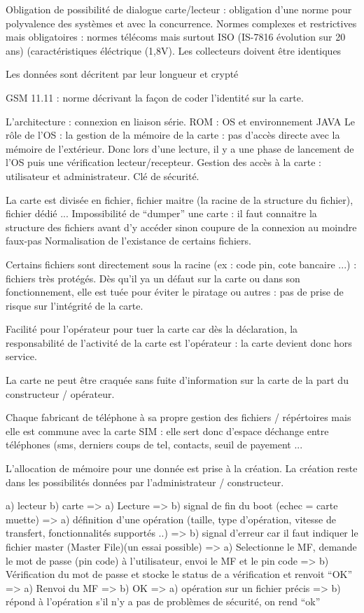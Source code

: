 \documentclass[a4paper,12pt]{article}
\begin{document}
Obligation de possibilité de dialogue carte/lecteur : obligation d'une norme pour polyvalence des systèmes et avec la concurrence.
Normes complexes et restrictives mais obligatoires : normes télécoms mais surtout ISO (IS-7816 évolution sur 20 ans) (caractéristiques éléctrique (1,8V). Les collecteurs doivent être identiques

Les données sont décritent par leur longueur et crypté

GSM 11.11 : norme décrivant la façon de coder l'identité sur la carte.

L'architecture : connexion en liaison série.
ROM : OS et environnement JAVA
Le rôle de l'OS : la gestion de la mémoire de la carte : pas d'accès directe avec la mémoire de l'extérieur.
Donc lors d'une lecture, il y a une phase de lancement de l'OS puis une vérification lecteur/recepteur.
Gestion des accès à la carte : utilisateur et administrateur. Clé de sécurité.

La carte est divisée en fichier, fichier maitre (la racine de la structure du fichier), fichier dédié ...
Impossibilité de ``dumper'' une carte : il faut connaitre la structure des fichiers avant d'y accéder sinon coupure de la connexion au moindre faux-pas
Normalisation de l'existance de certains fichiers. 

Certains fichiers sont directement sous la racine (ex : code pin, cote bancaire ...) : fichiers très protégés.
Dès qu'il ya un défaut sur la carte ou dans son fonctionnement, elle est tuée pour éviter le piratage ou autres : pas de prise de risque sur l'intégrité de la carte.

Facilité pour l'opérateur pour tuer la carte car dès la déclaration, la responsabilité de l'activité de la carte est l'opérateur : la carte devient donc hors service.

La carte ne peut être craquée sans fuite d'information sur la carte de la part du constructeur / opérateur.

Chaque fabricant de téléphone à sa propre gestion des fichiers / répértoires mais elle est commune avec la carte SIM : elle sert donc d'espace déchange entre téléphones (sms, derniers coups de tel, contacts, seuil de payement ...

L'allocation de mémoire pour une donnée est prise à la création. La création reste dans les possibilités données par l'administrateur / constructeur.


a) lecteur
b) carte
=> a) Lecture 
=> b) signal de fin du boot (echec = carte muette) 
=> a) définition d'une opération (taille, type d'opération, vitesse de transfert, fonctionnalités supportés ..) 
=> b) signal d'erreur car il faut indiquer le fichier master (Master File)(un essai possible) 
=> a) Selectionne le MF, demande le mot de passe (pin code) à l'utilisateur, envoi le MF et le pin code 
=> b) Vérification du mot de passe et stocke le status de a vérification et renvoit ``OK''
=> a) Renvoi du MF
=> b) OK
=> a) opération sur un fichier précis
=> b) répond à l'opération s'il n'y a pas de problèmes de sécurité, on rend ``ok''
\end{document}
